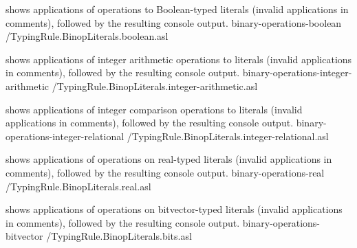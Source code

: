 

 shows applications
of operations to Boolean-typed literals (invalid applications in comments),
followed by the resulting console output.
  {binary-operations-boolean}
  {\typingtests/TypingRule.BinopLiterals.boolean.asl}


 shows applications
of integer arithmetic operations to literals (invalid applications in comments),
followed by the resulting console output.
  {binary-operations-integer-arithmetic}
  {\typingtests/TypingRule.BinopLiterals.integer-arithmetic.asl}


 shows applications
of integer comparison operations to literals (invalid applications in comments),
followed by the resulting console output.
  {binary-operations-integer-relational}
  {\typingtests/TypingRule.BinopLiterals.integer-relational.asl}


 shows applications
of operations on real-typed literals (invalid applications in comments),
followed by the resulting console output.
  {binary-operations-real}
  {\typingtests/TypingRule.BinopLiterals.real.asl}


 shows applications
of operations on bitvector-typed literals (invalid applications in comments),
followed by the resulting console output.
  {binary-operations-bitvector}
  {\typingtests/TypingRule.BinopLiterals.bits.asl}

